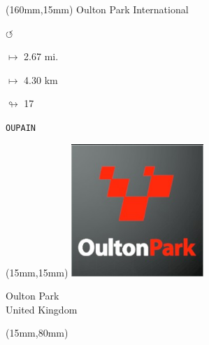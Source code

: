 \begin{textblock*}{40mm}(160mm,15mm)%
Oulton Park International
\par \Huge$\circlearrowleft$
\Large
\par$\mapsto$ 2.67 mi.
\par$\mapsto$ 4.30 km
\par$\looparrowright$ 17
\par\hfill\tiny\tt OUPAIN\\
\end{textblock*}
\null\newpage

\begin{textblock*}{50mm}(15mm,15mm)%
\includegraphics[width=50mm]{LG/2015-05-20_00091.png}
\par Oulton Park\\ United Kingdom
\end{textblock*}
\begin{textblock*}{185mm}(15mm,80mm)%
\end{textblock*}
